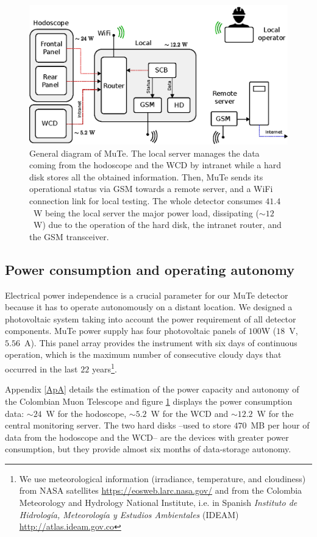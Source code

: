 \documentclass[letterpaper,11pt]{article}
\begin{document}
\begin{figure}
\centering
\includegraphics[width=0.8\columnwidth]{Figures/Total2.eps}
\caption{General diagram of MuTe. The local server manages the data coming from the hodoscope and the WCD by intranet while a hard disk stores all the obtained information. Then, MuTe sends its operational status via GSM towards a remote server, and a WiFi connection link for local testing. The whole detector consumes $41.4$~W being the local server the major power load, dissipating ($\sim 12$~W) due to the operation of the hard disk, the intranet router, and the GSM transceiver.}
\label{fig:power}
\end{figure}

\subsection{Power consumption and operating autonomy}
Electrical power independence is a crucial parameter for our MuTe detector because it has to operate autonomously on a distant location. We designed a photovoltaic system taking into account the power requirement of all detector components. MuTe power supply has four photovoltaic panels of $100$W ($18$~V, $5.56$~A). This panel array provides the instrument with six days of continuous operation, which is the maximum number of consecutive cloudy days that occurred in the last $22$ years\footnote{We use meteorological information (irradiance, temperature, and cloudiness) from NASA satellites \url{https://eosweb.larc.nasa.gov/} and from the Colombia Meteorology and Hydrology National Institute, i.e. in Spanish \textit{Instituto de Hidrología, Meteorología y Estudios Ambientales} (IDEAM) \url{http://atlas.ideam.gov.co}}. 

Appendix \ref{ApA} details the estimation of the power capacity and autonomy of the Colombian Muon Telescope and figure \ref{fig:power} displays the power consumption data: $\sim 24$~W for the hodoscope,  $\sim 5.2$~W for the WCD  and $\sim 12.2$~W for the central monitoring server. The two hard disks  --used to store $470$~MB per hour of data from the hodoscope and the WCD-- are the devices with greater power consumption, but they provide almost six months of data-storage autonomy.
\end{document}
